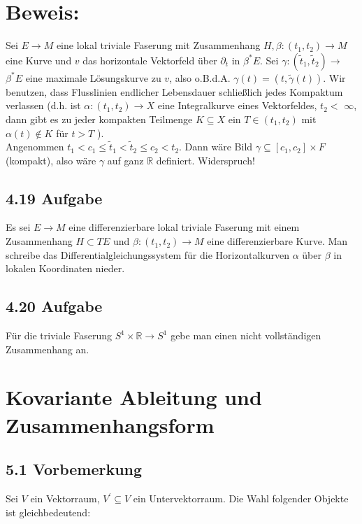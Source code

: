 \documentclass[10pt, letterpaper]{article}
\begin{document}
\section*{Beweis:}
Sei $E \rightarrow M$ eine lokal triviale Faserung mit Zusammenhang $H, \beta:\left(t_{1}, t_{2}\right) \rightarrow M$ eine Kurve und $v$ das horizontale Vektorfeld über $\partial_{t}$ in $\beta^{*} E$. Sei $\gamma:\left(\tilde{t}_{1}, \tilde{t}_{2}\right) \rightarrow$ $\beta^{*} E$ eine maximale Lösungskurve zu $v$, also o.B.d.A. $\gamma(t)=(t, \tilde{\gamma}(t))$. Wir benutzen, dass Flusslinien endlicher Lebensdauer schließlich jedes Kompaktum verlassen (d.h. ist $\alpha:\left(t_{1}, t_{2}\right) \rightarrow X$ eine Integralkurve eines Vektorfeldes, $t_{2}<$ $\infty$, dann gibt es zu jeder kompakten Teilmenge $K \subseteq X$ ein $T \in\left(t_{1}, t_{2}\right)$ mit $\alpha(t) \notin K$ für $t>T$ ).\\
Angenommen $t_{1}<c_{1} \leq \tilde{t}_{1}<\tilde{t}_{2} \leq c_{2}<t_{2}$. Dann wäre Bild $\gamma \subseteq\left[c_{1}, c_{2}\right] \times F$ (kompakt), also wäre $\gamma$ auf ganz $\mathbb{R}$ definiert. Widerspruch!

\subsection*{4.19 Aufgabe}
Es sei $E \rightarrow M$ eine differenzierbare lokal triviale Faserung mit einem Zusammenhang $H \subset T E$ und $\beta:\left(t_{1}, t_{2}\right) \rightarrow M$ eine differenzierbare Kurve. Man schreibe das Differentialgleichungssystem für die Horizontalkurven $\alpha$ über $\beta$ in lokalen Koordinaten nieder.

\subsection*{4.20 Aufgabe}
Für die triviale Faserung $S^{1} \times \mathbb{R} \rightarrow S^{1}$ gebe man einen nicht vollständigen Zusammenhang an.



\pagebreak

\section{Kovariante Ableitung und Zusammenhangsform}
\subsection*{5.1 Vorbemerkung}
Sei $V$ ein Vektorraum, $V^{\prime} \subseteq V$ ein Untervektorraum. Die Wahl folgender Objekte ist gleichbedeutend:
\end{document}
